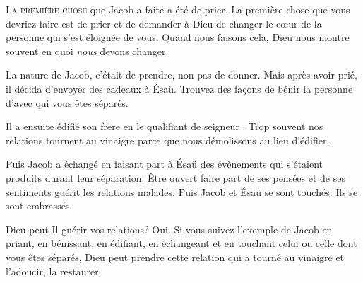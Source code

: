 \dvrule








\lettrine{L}{a première chose} que Jacob a faite a été de prier.
 La première chose que vous devriez faire est de prier et de demander
 à Dieu de changer le c\oe{}ur de la personne qui s'est éloignée de vous.
 Quand nous faisons cela, Dieu nous montre souvent en quoi \emph{nous} devons changer.

La nature de Jacob, c'était de prendre, non pas de donner.
 Mais après avoir prié, il décida d'envoyer des cadeaux à Ésaü.
 Trouvez des fa\c{c}ons de bénir la personne d'avec qui vous êtes séparés. 

Il a ensuite édifié son frère en le qualifiant de \Og seigneur \Fg{}.
 Trop souvent nos relations tournent au vinaigre parce que nous démolissons
 au lieu d'édifier. 

Puis Jacob a échangé en faisant part à Ésaü des évènements
 qui s'étaient produits durant leur séparation.
 Être ouvert \ocadr{}faire part de ses pensées et de ses sentiments\fcadr{}
 guérit les relations malades.
 Puis Jacob et Ésaü se sont touchés. Ils se sont embrassés. 

Dieu peut-Il guérir vos relations? Oui. Si vous suivez l'exemple de Jacob
 \ocadr{}en priant, en bénissant, en édifiant, en échangeant et en touchant
 celui ou celle dont vous êtes séparés, Dieu peut prendre cette relation
 qui a tourné au vinaigre et l'adoucir, la restaurer. 

\dvrule



